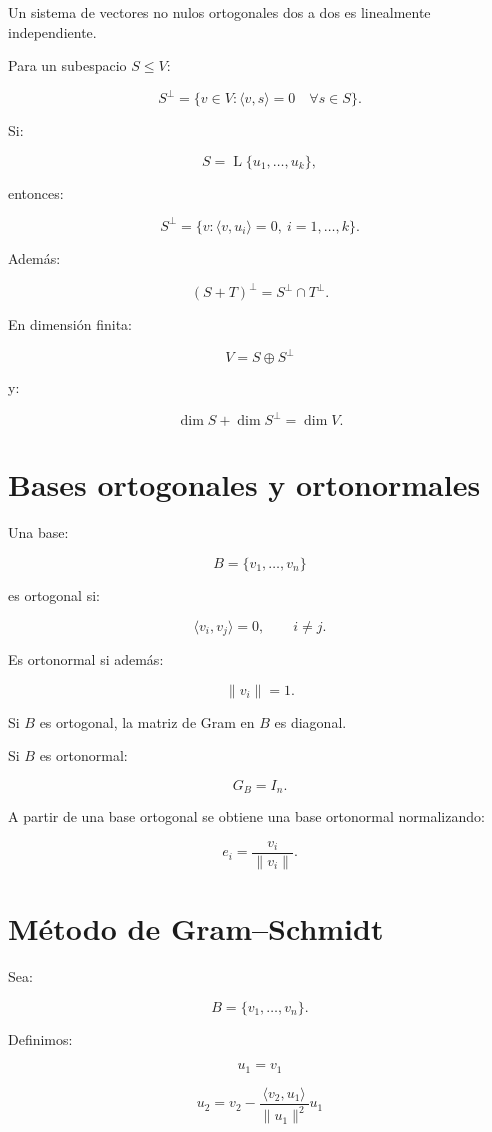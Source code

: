 \documentclass[11pt,a4paper]{article}
\newcommand{\Span}{\operatorname{L}}
\begin{document}
Un sistema de vectores no nulos ortogonales dos a dos es linealmente independiente.

Para un subespacio $S\leq V$:

\[
\boxed{
S^\perp
=
\{v\in V:
\langle v,s\rangle=0
\quad
\forall s\in S
\}.
}
\]

Si:

\[
S=\Span\{u_1,\ldots,u_k\},
\]

entonces:

\[
\boxed{
S^\perp
=
\{v:
\langle v,u_i\rangle=0,
\ i=1,\ldots,k\}.
}
\]

Además:

\[
\boxed{
(S+T)^\perp
=
S^\perp\cap T^\perp.
}
\]

En dimensión finita:

\[
\boxed{
V=S\oplus S^\perp
}
\]

y:

\[
\boxed{
\dim S+\dim S^\perp=\dim V.
}
\]

\section{Bases ortogonales y ortonormales}

Una base:

\[
B=\{v_1,\ldots,v_n\}
\]

es ortogonal si:

\[
\langle v_i,v_j\rangle=0,
\qquad
i\neq j.
\]

Es ortonormal si además:

\[
\|v_i\|=1.
\]

Si $B$ es ortogonal, la matriz de Gram en $B$ es diagonal.

Si $B$ es ortonormal:

\[
\boxed{
G_B=I_n.
}
\]

A partir de una base ortogonal se obtiene una base ortonormal normalizando:

\[
\boxed{
e_i=
\frac{v_i}{\|v_i\|}.
}
\]

\section{Método de Gram--Schmidt}

Sea:

\[
B=\{v_1,\ldots,v_n\}.
\]

Definimos:

\[
u_1=v_1
\]

\[
u_2
=
v_2-
\frac{\langle v_2,u_1\rangle}
{\|u_1\|^2}u_1
\]
\end{document}
